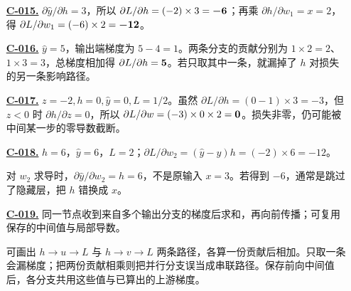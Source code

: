 \begin{enumerate}[label={},leftmargin=4.8em,itemsep=4pt]
\item[\textbf{\hyperref[exercise:local-chain-gradient]{C-015.}}] \leavevmode{}\label{solution:C-015}\label{solution:local-chain-gradient}$\partial\widehat{y}/\partial h=3$，所以 $\partial L/\partial h=(-2)\times3=\boldsymbol{-6}$；再乘 $\partial h/\partial w_1=x=2$，得 $\partial L/\partial w_1=(-6)\times2=\boldsymbol{-12}$。
\item[\textbf{\hyperref[exercise:branch-gradient-sum]{C-016.}}] \leavevmode{}\label{solution:C-016}\label{solution:branch-gradient-sum}$\widehat{y}=5$，输出端梯度为 $5-4=1$。两条分支的贡献分别为 $1\times2=2$、$1\times3=3$，总梯度相加得 $\partial L/\partial h=\boldsymbol{5}$。若只取其中一条，就漏掉了 $h$ 对损失的另一条影响路径。
\item[\textbf{\hyperref[exercise:relu-blocked-gradient]{C-017.}}] \leavevmode{}\label{solution:C-017}\label{solution:relu-blocked-gradient}$z=-2,h=0,\widehat{y}=0,L=1/2$。虽然 $\partial L/\partial h=(0-1)\times3=-3$，但 $z<0$ 时 $\partial h/\partial z=0$，所以 $\partial L/\partial w=(-3)\times0\times2=\boldsymbol{0}$。损失非零，仍可能被中间某一步的零导数截断。
\item[\textbf{\hyperref[exercise:scalar-chain-forward]{C-018.}}] \leavevmode{}\label{solution:C-018}\label{solution:scalar-chain-forward}$h=6$，$\widehat{y}=6$，$L=2$；$\partial L/\partial w_2=(\widehat{y}-y)h=(-2)\times6=-12$。\par 对 $w_2$ 求导时，$\partial\widehat{y}/\partial w_2=h=6$，不是原输入 $x=3$。若得到 $-6$，通常是跳过了隐藏层，把 $h$ 错换成 $x$。
\item[\textbf{\hyperref[exercise:branch-gradient-reuse]{C-019.}}] \leavevmode{}\label{solution:C-019}\label{solution:branch-gradient-reuse}同一节点收到来自多个输出分支的梯度后求和，再向前传播；可复用保存的中间值与局部导数。\par 可画出 $h\to u\to L$ 与 $h\to v\to L$ 两条路径，各算一份贡献后相加。只取一条会漏梯度；把两份贡献相乘则把并行分支误当成串联路径。保存前向中间值后，各分支共用这些值与已算出的上游梯度。
\end{enumerate}
